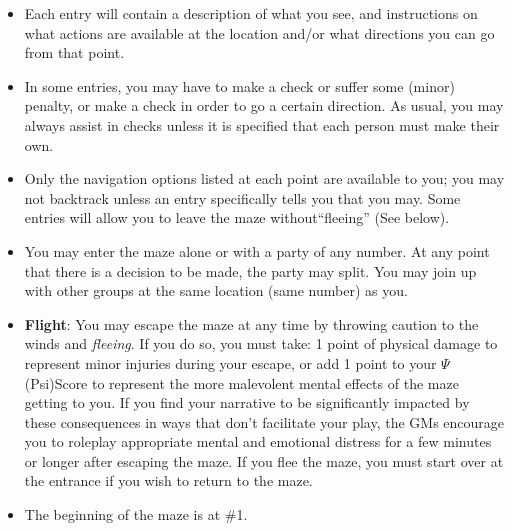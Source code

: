 \documentclass[green]{gl2018}
\begin{document}
\begin{itemize}
\item Each entry will contain a description of what you see, and instructions on what actions are available at the location and/or what directions you can go from that point.  
\item In some entries, you may have to make a check or suffer some (minor) penalty, or make a check in order to go a certain direction. As usual, you may always assist in checks unless it is specified that each person must make their own. 
\item Only the navigation options listed at each point are available to you; you may not backtrack unless an entry specifically tells you that you may. Some entries will allow you to leave the maze without``fleeing'' (See below).
\item You may enter the maze alone or with a party of any number. At any point that there is a decision to be made, the party may split. You may join up with other groups at the same location (same number) as you. 
\item {\bf Flight}: You may escape the maze at any time by throwing caution to the winds and {\em fleeing}. If you do so, you must take: 1 point of physical damage to represent minor injuries during your escape, or add 1 point to your $\Psi$ (Psi)Score to represent the more malevolent mental effects of the maze getting to you. If you find your narrative to be significantly impacted by these consequences in ways that don't facilitate your play, the GMs encourage you to roleplay appropriate mental and emotional distress for a few minutes or longer after escaping the maze. If you flee the maze, you must start over at the entrance if you wish to return to the maze. 
\item The beginning of the maze is at \#1.
\end{itemize}
\pagebreak
\end{document}
